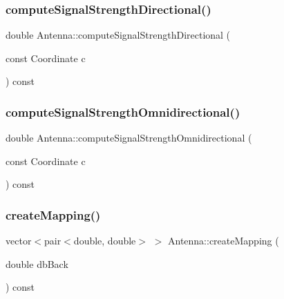 \subsubsection{\texorpdfstring{computeSignalStrengthDirectional()}{computeSignalStrengthDirectional()}}
{\footnotesize\ttfamily double Antenna\+::compute\+Signal\+Strength\+Directional (\begin{DoxyParamCaption}\item[{const Coordinate}]{c }\end{DoxyParamCaption}) const\hspace{0.3cm}{\ttfamily [private]}}

\mbox{\label{class_antenna_a26077f4061413733cedf9253ecc8686f}} 
\subsubsection{\texorpdfstring{computeSignalStrengthOmnidirectional()}{computeSignalStrengthOmnidirectional()}}
{\footnotesize\ttfamily double Antenna\+::compute\+Signal\+Strength\+Omnidirectional (\begin{DoxyParamCaption}\item[{const Coordinate}]{c }\end{DoxyParamCaption}) const\hspace{0.3cm}{\ttfamily [private]}}

\mbox{\label{class_antenna_afe86e36673d4b28713f983cc63d89e1b}} 
\subsubsection{\texorpdfstring{createMapping()}{createMapping()}}
{\footnotesize\ttfamily vector$<$pair$<$double, double$>$ $>$ Antenna\+::create\+Mapping (\begin{DoxyParamCaption}\item[{double}]{db\+Back }\end{DoxyParamCaption}) const\hspace{0.3cm}{\ttfamily [private]}}

\mbox{\label{class_antenna_a983a0784315567c2ab6ac1820cf558c5}} 
